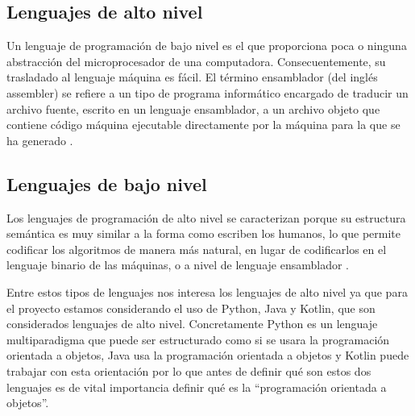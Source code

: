 \subsection{Lenguajes de alto nivel}

\begin{list}{}%
    {\setlength{\leftmargin}{1cm}\setlength{\rightmargin}{1cm}}
    \item\relax
    \small

Un lenguaje de programación de bajo nivel es el que proporciona poca o ninguna abstracción del microprocesador de una computadora. Consecuentemente, su trasladado al lenguaje máquina es fácil. El término ensamblador (del inglés assembler) se refiere a un tipo de programa informático encargado de traducir un archivo fuente, escrito en un lenguaje ensamblador, a un archivo objeto que contiene código máquina ejecutable directamente por la máquina para la que se ha generado \cite{CitaD10}. 

\end{list}

\subsection{Lenguajes de bajo nivel}

\begin{list}{}%
    {\setlength{\leftmargin}{1cm}\setlength{\rightmargin}{1cm}}
    \item\relax
    \small

Los lenguajes de programación de alto nivel se caracterizan porque su estructura semántica es muy similar a la forma como escriben los humanos, lo que permite codificar los algoritmos de manera más natural, en lugar de codificarlos en el lenguaje binario de las máquinas, o a nivel de lenguaje ensamblador \cite{CitaD10}. 

\end{list}

Entre estos tipos de lenguajes nos interesa los lenguajes de alto nivel ya que para el proyecto estamos considerando el uso de Python, Java y Kotlin, que son considerados lenguajes de alto nivel. Concretamente Python es un lenguaje multiparadigma que puede ser estructurado como si se usara la programación orientada a objetos, Java usa la programación orientada a objetos y Kotlin puede trabajar con esta orientación por lo que antes de definir qué son estos dos lenguajes es de vital importancia definir qué es la “programación orientada a objetos”.


